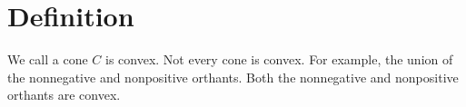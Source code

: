

\section*{Definition}

We call a cone $C$ is convex.
Not every cone is convex. For example, the union of the nonnegative and nonpositive orthants.
Both the nonnegative and nonpositive orthants are convex.

\blankpage